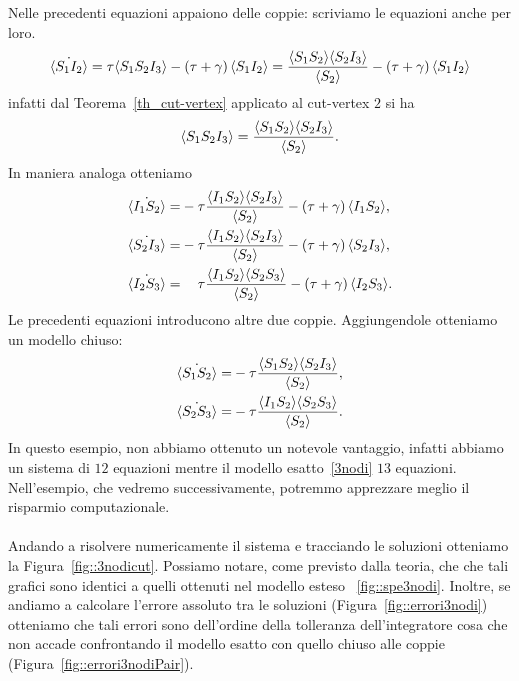 Nelle precedenti equazioni appaiono delle coppie: scriviamo le equazioni anche per loro.\\
$$\dot{\langle S_1I_2 \rangle}=\tau
\langle S_1S_2I_3 \rangle - \left(  \tau + \gamma \right)\langle S_1 I_2 \rangle = \frac{
\langle S_1S_2 \rangle\langle S_2I_3 \rangle}{\langle S_2 \rangle} - \left(  \tau + \gamma \right)\langle S_1 I_2 \rangle$$ 
infatti  dal Teorema~\ref{th_cut-vertex} applicato al cut-vertex $2$ si ha  
$$ \langle S_1S_2I_3 \rangle = \frac{ \langle S_1S_2 \rangle\langle S_2I_3 \rangle}{\langle S_2 \rangle}.$$ 
In maniera analoga otteniamo 
\begin{equation*}
\begin{aligned}
\dot{\angol{I_1S_2}}=&-\tau\frac{\angol{I_1S_2}\angol{S_2I_3}}{\angol{S_2}} - \tonde{ \tau + \gamma}\angol{I_1 S_2},
\\
\dot{\angol{S_2I_3}}=&-\tau\frac{\angol{I_1S_2}\angol{S_2I_3}}{\angol{S_2}} - \tonde{ \tau + \gamma}\angol{S_2 I_3},
\\
\dot{\angol{I_2S_3}}=&\spa\tau\frac{\angol{I_1S_2}\angol{S_2S_3}}{\angol{S_2}} - \tonde{ \tau + \gamma}\angol{I_2 S_3}.
\end{aligned}
\end{equation*}
Le precedenti equazioni introducono altre due coppie. Aggiungendole otteniamo un modello chiuso: 
\begin{equation*}
\begin{aligned}
\dot{\langle S_1S_2 \rangle} = &- \tau\frac{\langle S_1S_2 \rangle\langle S_2I_3 \rangle}{\langle S_2 \rangle},\\
\dot{\langle S_2S_3 \rangle}= & -\tau \frac{\langle  I_1 S_2 \rangle\langle S_2S_3 \rangle}{\langle S_2 \rangle}.
	\end{aligned}	
\end{equation*}
In questo esempio, non abbiamo ottenuto un notevole vantaggio, infatti abbiamo un sistema di $12$ equazioni mentre il  modello esatto~\eqref{3nodi} $13$ equazioni. Nell'esempio, che vedremo successivamente, potremmo apprezzare meglio il risparmio computazionale.\\ \\
Andando a risolvere numericamente il sistema e tracciando le soluzioni otteniamo la  Figura~\ref{fig::3nodicut}. Possiamo notare, come previsto dalla teoria, che  che tali grafici sono identici a quelli ottenuti nel modello esteso ~\ref{fig::spe3nodi}. Inoltre, se andiamo a calcolare l'errore assoluto tra le soluzioni (Figura~\ref{fig::errori3nodi}) otteniamo che tali errori sono dell'ordine della tolleranza dell'integratore cosa che non accade confrontando il modello esatto con quello chiuso alle coppie (Figura~\ref{fig::errori3nodiPair}).
